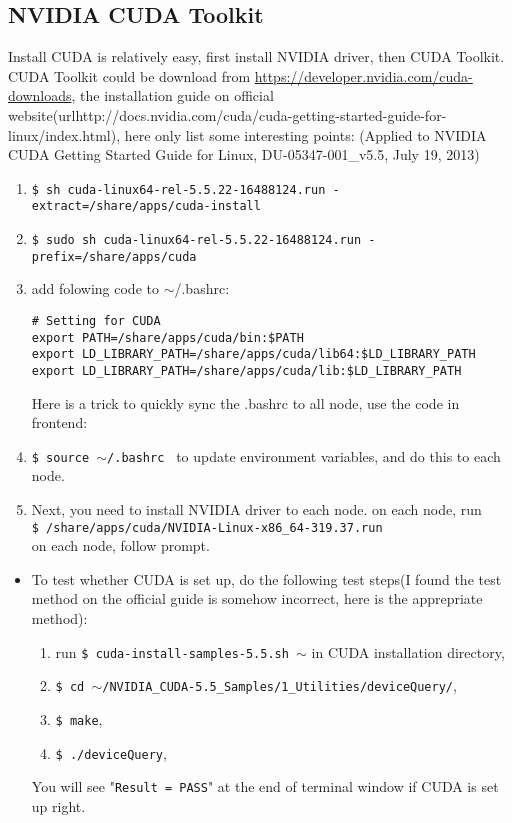 \subsection{NVIDIA CUDA Toolkit}
Install CUDA is relatively easy, first install NVIDIA driver, then CUDA Toolkit. CUDA Toolkit could be download from \url{https://developer.nvidia.com/cuda-downloads}, the installation guide on official website(url{http://docs.nvidia.com/cuda/cuda-getting-started-guide-for-linux/index.html}), here only list some interesting points: (Applied to NVIDIA CUDA Getting Started Guide for Linux, DU-05347-001\_v5.5, July 19, 2013)
\begin{enumerate}
\item {\tt \$ sh cuda-linux64-rel-5.5.22-16488124.run -extract=/share/apps/cuda-install }
\item {\tt \$ sudo sh cuda-linux64-rel-5.5.22-16488124.run -prefix=/share/apps/cuda }
\item add folowing code to $\sim$/.bashrc:
\begin{lstlisting}[basicstyle=\ttfamily\scriptsize,columns=fullflexible]
# Setting for CUDA
export PATH=/share/apps/cuda/bin:$PATH
export LD_LIBRARY_PATH=/share/apps/cuda/lib64:$LD_LIBRARY_PATH
export LD_LIBRARY_PATH=/share/apps/cuda/lib:$LD_LIBRARY_PATH
\end{lstlisting}
\begin{remark}
Here is a trick to quickly sync the .bashrc to all node, use the code in frontend:

\end{remark}
\item {\tt \$ source $\sim$/.bashrc } to update environment variables, and do this to each node.
\item Next, you need to install NVIDIA driver to each node. on each node, run \\ 
{\tt \$ /share/apps/cuda/NVIDIA-Linux-x86\_64-319.37.run } \\
on each node, follow prompt.
\end{enumerate}
\begin{itemize}
\item To test whether CUDA is set up, do the following test steps(I found the test method on the official guide is somehow incorrect, here is the apprepriate method):
\begin{enumerate}
\item run {\tt \$ cuda-install-samples-5.5.sh $\sim$} in CUDA installation directory,
\item {\tt \$ cd $\sim$/NVIDIA\_CUDA-5.5\_Samples/1\_Utilities/deviceQuery/},
\item {\tt \$ make},
\item {\tt \$ ./deviceQuery},
\end{enumerate}
You will see "{\tt Result = PASS}" at the end of terminal window if CUDA is set up right.
\end{itemize}
